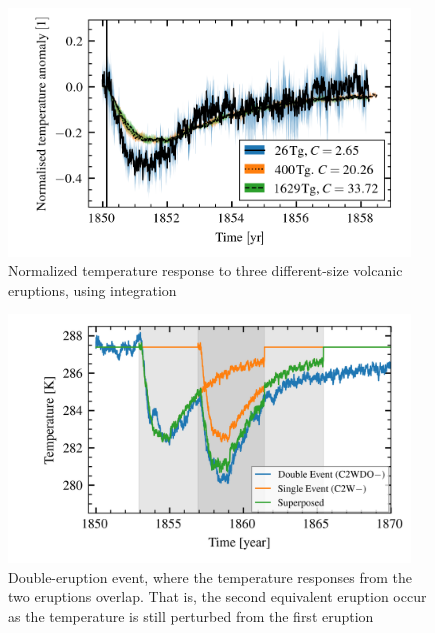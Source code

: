 \documentclass{ametsocV5}
\begin{document}
\begin{figure}
  \begin{center}
    \includegraphics[width=0.95\textwidth]{figures/compare-waveform-integrate.png}
  \end{center}
  \caption{Normalized temperature response to three different-size volcanic eruptions,
    using integration}
  \label{fig:temp_norm_int}
\end{figure}

\begin{figure}
  \begin{center}
    \includegraphics[width=0.95\textwidth]{figures/double-overlap-superpose.png}
  \end{center}
  \caption{Double-eruption event, where the temperature responses from the two
    eruptions overlap. That is, the second equivalent eruption occur as the temperature
    is still perturbed from the first eruption}
  \label{fig:double-overlap-superpose}
\end{figure}
\end{document}
